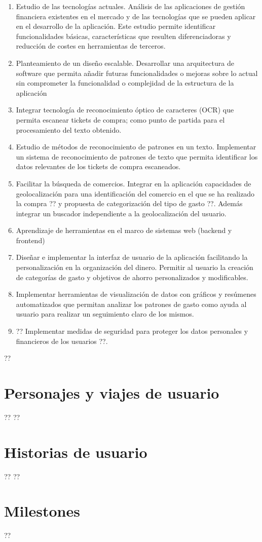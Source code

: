 \begin{enumerate}
    \item Estudio de las tecnologías actuales. Análisis de las aplicaciones 
        de gestión financiera existentes en el mercado y de las tecnologías 
        que se pueden aplicar en el desarrollo de la aplicación. Este estudio 
        permite identificar funcionalidades básicas, características que
        resulten diferenciadoras y reducción de costes en herramientas de terceros.
    \item Planteamiento de un diseño escalable. Desarrollar una arquitectura de
        software que permita añadir futuras funcionalidades o mejoras sobre lo actual 
        sin comprometer la funcionalidad o complejidad de la estructura de la aplicación
    \item Integrar tecnología de reconocimiento óptico de caracteres (OCR) que 
        permita escanear tickets de compra; como punto de partida para el procesamiento 
        del texto obtenido.
    \item Estudio de métodos de reconocimiento de patrones en un texto. Implementar 
        un sistema de reconocimiento de patrones de texto que permita identificar 
        los datos relevantes de los tickets de compra escaneados.
    \item Facilitar la búsqueda de comercios. Integrar en la aplicación capacidades de geolocalización 
        para una identificación del comercio en el que se ha realizado la compra 
        ?? y propuesta de categorización del tipo de gasto ??. Además integrar un buscador 
        independiente a la geolocalización del usuario.     
    \item Aprendizaje de herramientas en el marco de sistemas web (backend y frontend)
    \item Diseñar e implementar la interfaz de usuario de la aplicación facilitando
         la personalización en la organización del dinero. Permitir al usuario la creación 
         de categorías de gasto y objetivos de ahorro personalizados y modificables.
    \item Implementar herramientas de visualización de datos con gráficos y resúmenes 
        automatizados que permitan analizar los patrones de gasto como ayuda al usuario 
        para realizar un seguimiento claro de los mismos.
    \item ?? Implementar medidas de seguridad para proteger los datos personales y 
        financieros de los usuarios ??.
    
\end{enumerate}



?? \section{Personajes y viajes de usuario} ??
?? \section{Historias de usuario} ??
?? \section{Milestones} ??
